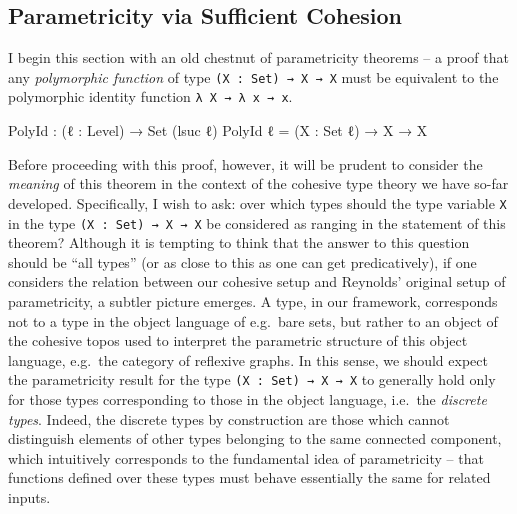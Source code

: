 \documentclass[
  12pt]{article}
\newenvironment{Shaded}{\begin{snugshade}}{\end{snugshade}}
\newcommand{\DataTypeTok}[1]{\textcolor[rgb]{0.00,0.34,0.68}{#1}}
\newcommand{\NormalTok}[1]{\textcolor[rgb]{0.12,0.11,0.11}{#1}}
\newcommand{\OtherTok}[1]{\textcolor[rgb]{0.00,0.43,0.16}{#1}}
\begin{document}
\subsection{Parametricity via Sufficient
Cohesion}\label{parametricity-via-sufficient-cohesion}

I begin this section with an old chestnut of parametricity theorems -- a
proof that any \emph{polymorphic function} of type
\texttt{(X\ :\ Set)\ →\ X\ →\ X} must be equivalent to the polymorphic
identity function \texttt{λ\ X\ →\ λ\ x\ →\ x}.

\begin{Shaded}
\begin{Highlighting}[]
\NormalTok{PolyId }\OtherTok{:} \OtherTok{(}\NormalTok{ℓ }\OtherTok{:}\NormalTok{ Level}\OtherTok{)} \OtherTok{→} \DataTypeTok{Set} \OtherTok{(}\NormalTok{lsuc ℓ}\OtherTok{)}
\NormalTok{PolyId ℓ }\OtherTok{=} \OtherTok{(}\NormalTok{X }\OtherTok{:} \DataTypeTok{Set}\NormalTok{ ℓ}\OtherTok{)} \OtherTok{→}\NormalTok{ X }\OtherTok{→}\NormalTok{ X}
\end{Highlighting}
\end{Shaded}

Before proceeding with this proof, however, it will be prudent to
consider the \emph{meaning} of this theorem in the context of the
cohesive type theory we have so-far developed. Specifically, I wish to
ask: over which types should the type variable \texttt{X} in the type
\texttt{(X\ :\ Set)\ →\ X\ →\ X} be considered as ranging in the
statement of this theorem? Although it is tempting to think that the
answer to this question should be ``all types'' (or as close to this as
one can get predicatively), if one considers the relation between our
cohesive setup and Reynolds' original setup of parametricity, a subtler
picture emerges. A type, in our framework, corresponds not to a type in
the object language of e.g.~bare sets, but rather to an object of the
cohesive topos used to interpret the parametric structure of this object
language, e.g.~the category of reflexive graphs. In this sense, we
should expect the parametricity result for the type
\texttt{(X\ :\ Set)\ →\ X\ →\ X} to generally hold only for those types
corresponding to those in the object language, i.e.~the \emph{discrete
types}. Indeed, the discrete types by construction are those which
cannot distinguish elements of other types belonging to the same
connected component, which intuitively corresponds to the fundamental
idea of parametricity -- that functions defined over these types must
behave essentially the same for related inputs.
\end{document}
